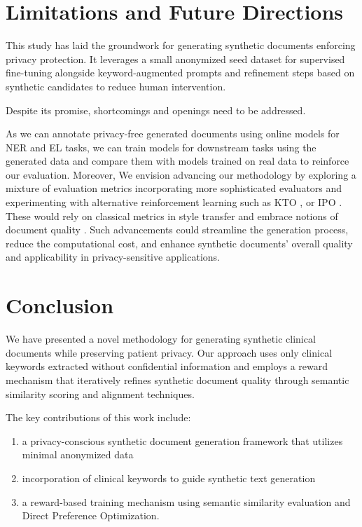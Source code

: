 \section{Limitations and Future Directions}

This study has laid the groundwork for generating synthetic documents enforcing privacy protection. It leverages a small anonymized seed dataset for supervised fine-tuning alongside keyword-augmented prompts and refinement steps based on synthetic candidates to reduce human intervention. 

Despite its promise, shortcomings and openings need to be addressed. 

As we can annotate privacy-free generated documents using online models for NER and EL tasks, we can train models for downstream tasks using the generated data and compare them with models trained on real data to reinforce our evaluation. Moreover, We envision advancing our methodology by exploring a mixture of evaluation metrics incorporating more sophisticated evaluators and experimenting with alternative reinforcement learning such as KTO \cite{ethayarajh_kto_2024}, or IPO \cite{azar_general_2023}. These would rely on classical metrics in style transfer and embrace notions of document quality \cite{jin_deep_2022}. Such advancements could streamline the generation process, reduce the computational cost, and enhance synthetic documents' overall quality and applicability in privacy-sensitive applications.

\section{Conclusion}

We have presented a novel methodology for generating synthetic clinical documents while preserving patient privacy. Our approach uses only clinical keywords extracted without confidential information and employs a reward mechanism that iteratively refines synthetic document quality through semantic similarity scoring and alignment techniques.

The key contributions of this work include:
\begin{enumerate}
\item a privacy-conscious synthetic document generation framework that utilizes minimal anonymized data
\item incorporation of clinical keywords to guide synthetic text generation
\item a reward-based training mechanism using semantic similarity evaluation and Direct Preference Optimization.
\end{enumerate}

